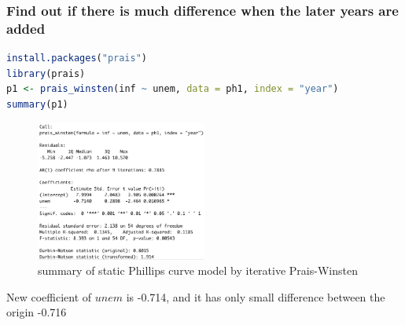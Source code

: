 \documentclass[12pt]{article}
\begin{document}
\subsubsection*{Find out if there is much difference when the later years are added}
\begin{lstlisting}[language = R]
install.packages("prais")
library(prais)
p1 <- prais_winsten(inf ~ unem, data = ph1, index = "year")
summary(p1)
\end{lstlisting}
\begin{figure}[H]
    \centering
    \includegraphics*[width = 0.5\textwidth]{M3.png}
    \caption{summary of static Phillips curve model by iterative Prais-Winsten}
\end{figure}
New coefficient of $unem$ is -0.714, and it has only small difference between the origin -0.716
\end{document}
